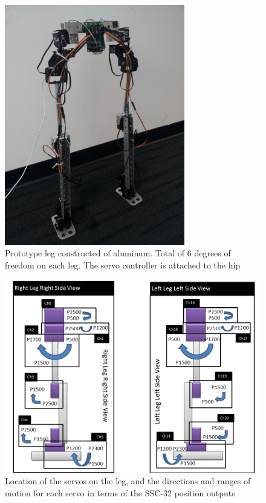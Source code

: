 \documentclass[titlepage,letterpaper,12pt]{article}
\begin{document}
\begin{figure}
  \centering
    \includegraphics[width=0.7\textwidth,angle=270]{figures/LegPrototype.jpg}
  \caption{Prototype leg constructed of aluminum. Total of 6 degrees of freedom
  on each leg. The servo controller is attached to the hip}
  \label{protolegfig}
\end{figure}

\begin{figure}
  \centering
    \includegraphics[width=1.0\textwidth]{figures/LegConfiguration.png}
  \caption{Location of the servos on the leg, and the directions and ranges of
  motion for each servo in terms of the SSC-32 position outputs}
  \label{servosetupfig}
\end{figure}
\end{document}
